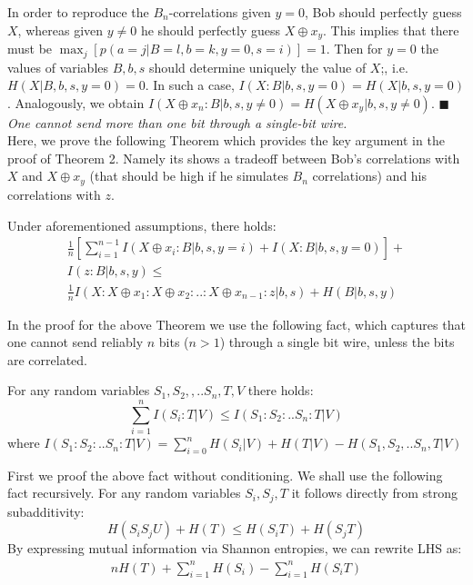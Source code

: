 In order to reproduce the $B_n$-correlations given $y=0$, Bob should perfectly guess $X$, whereas given $y\neq 0$ he should perfectly guess $X\oplus x_y$. 
This implies that there must be $\max_j[p(a=j|B=l,b=k,y=0,s=i)]=1$. Then for $y=0$ the values of variables $B,b,s$ should determine uniquely the value of $X$;, i.e. $H(X|B,b,s,y=0)=0$. In such a case, $I(X:B|b,s,y=0)=H(X|b,s,y=0)$. Analogously, we obtain $I(X\oplus x_n:B|b,s,y\neq 0)=H(X\oplus x_y|b,s,y\neq0)$. $\blacksquare$ \\
\textit{One cannot send more than one bit through a single-bit wire.} \\
Here, we prove the following Theorem which provides the key argument in the proof of Theorem 2. Namely its shows a tradeoff between Bob's correlations with $X$ and $X\oplus x_y$ (that should be high if he simulates $B_n$ correlations) and his correlations with $z$.
\begin{mydef1}
Under aforementioned assumptions, there holds:
\begin{multline}
 \frac{1}{n}[\sum_{i=1}^{n-1}I(X\oplus x_i:B|b,s,y=i) + I(X:B|b,s,y=0)] +\\ 
I(z:B|b,s,y) \leq \\ 
\frac{1}{n}I(X:X\oplus x_1:X\oplus x_2:..:X\oplus x_{n-1}:z |b,s) 
+H(B|b,s,y)
\end{multline}
\end{mydef1}
In the proof for the above Theorem we use the following fact, which captures that one cannot send reliably $n$ bits ($n>1$) through a single bit wire, unless the bits are correlated.
\begin{mydef2}
For any random variables $S_1,S_2,,..S_n,T,V$ there holds:
\begin{equation}
\sum_{i=1}^n I(S_i:T|V) \leq I(S_1:S_2:..S_n:T|V)
\end{equation}
where $I(S_1:S_2:..S_n:T|V)=\sum_{i=0}^{n}H(S_i|V)+H(T|V)-H(S_1,S_2,..S_n,T|V)$
\end{mydef2}
First we proof the above fact without conditioning. We shall use the following fact recursively. For any random variables $S_i,S_j,T$ it follows directly from strong subadditivity: 
\begin{equation}\label{e33}
H(S_iS_jU)+H(T)\leq H(S_iT) + H(S_jT)
\end{equation}
By expressing mutual information via Shannon entropies, we can rewrite LHS as:
\begin{multline}
nH(T)+\sum_{i=1}^{n}H(S_i)-\sum_{i=1}^{n}H(S_iT)
\end{multline}

